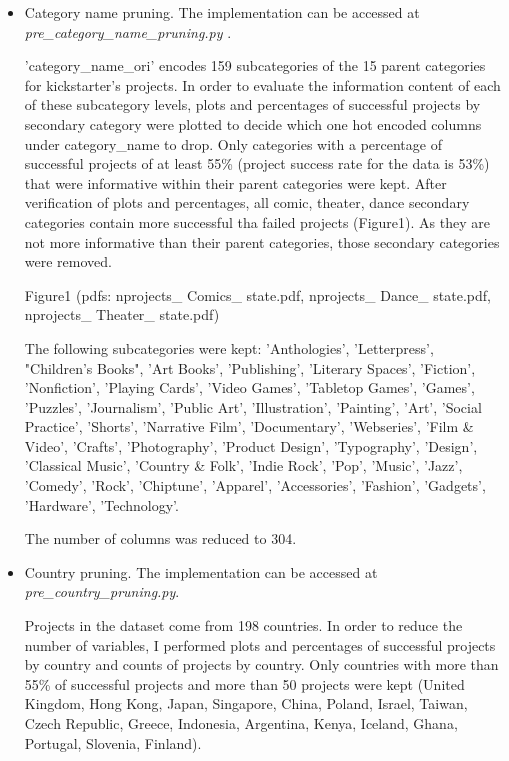 \documentclass{article}
\begin{document}
{\begin{itemize}
\begin{itemize}
	\item Category name pruning.
	The implementation can be accessed at \emph{pre\_category\_name\_pruning.py }.
	
	'category\_name\_ori' encodes 159 subcategories of the 15 parent categories for kickstarter's projects. In order to evaluate the information content of each of these subcategory levels, plots and percentages of successful projects by secondary category were plotted to decide which one hot encoded columns under category\_name to drop. Only categories with a percentage of successful projects of at least 55\% (project success rate for the data is 53\%) that were informative within their parent categories were kept.
	After verification of plots and percentages, all comic, theater, dance secondary categories contain more successful tha failed projects (Figure1). As they are not more informative than their parent categories, those secondary categories were removed. 
	
	Figure1 (pdfs: nprojects\_ Comics\_ state.pdf, nprojects\_ Dance\_ state.pdf, nprojects\_ Theater\_ state.pdf)
	
	The following subcategories were kept: 'Anthologies', 'Letterpress', "Children's Books", 'Art Books', 'Publishing', 'Literary Spaces', 'Fiction', 'Nonfiction', 'Playing Cards', 'Video Games', 'Tabletop Games', 'Games', 'Puzzles', 'Journalism', 'Public Art', 'Illustration', 'Painting', 'Art', 'Social Practice', 'Shorts', 'Narrative Film', 'Documentary', 'Webseries', 'Film \& Video', 'Crafts', 'Photography', 'Product Design', 'Typography', 'Design', 'Classical Music', 'Country \& Folk', 'Indie Rock', 'Pop', 'Music', 'Jazz', 'Comedy', 'Rock', 'Chiptune', 'Apparel', 'Accessories', 'Fashion', 'Gadgets', 'Hardware', 'Technology'.
	
	The number of columns was reduced to 304.
	
        \item Country pruning.
        The implementation can be accessed at \emph{pre\_country\_pruning.py}.  
	
	Projects in the dataset come from 198 countries. In order to reduce the number of variables, I performed plots and percentages of successful projects by country and counts of projects by country. Only countries with more than 55\% of successful projects and more than 50 projects were kept (United Kingdom, Hong Kong, Japan, Singapore, China, Poland, Israel, Taiwan, Czech Republic, Greece, Indonesia, Argentina, Kenya, Iceland, Ghana, Portugal, Slovenia, Finland).
	

\end{itemize}
\end{itemize}}
\end{document}
